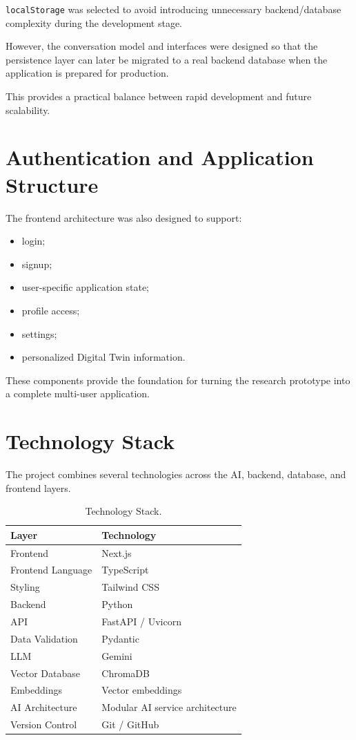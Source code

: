 \documentclass[12pt,a4paper]{article}
\begin{document}
\texttt{localStorage} was selected to avoid introducing unnecessary backend/database complexity during the development stage.

However, the conversation model and interfaces were designed so that the persistence layer can later be migrated to a real backend database when the application is prepared for production.

This provides a practical balance between rapid development and future scalability.

\section{Authentication and Application Structure}
The frontend architecture was also designed to support:
\begin{itemize}[noitemsep,topsep=2pt]
    \item login;
    \item signup;
    \item user-specific application state;
    \item profile access;
    \item settings;
    \item personalized Digital Twin information.
\end{itemize}

These components provide the foundation for turning the research prototype into a complete multi-user application.

\section{Technology Stack}
The project combines several technologies across the AI, backend, database, and frontend layers.

\begin{table}[htbp]
\centering
\renewcommand{\arraystretch}{1.2}
\begin{tabular}{|l|l|}
\hline
\textbf{Layer} & \textbf{Technology} \\
\hline
Frontend & Next.js \\
Frontend Language & TypeScript \\
Styling & Tailwind CSS \\
Backend & Python \\
API & FastAPI / Uvicorn \\
Data Validation & Pydantic \\
LLM & Gemini \\
Vector Database & ChromaDB \\
Embeddings & Vector embeddings \\
AI Architecture & Modular AI service architecture \\
Version Control & Git / GitHub \\
\hline
\end{tabular}
\caption{Technology Stack.}
\end{table}
\end{document}
